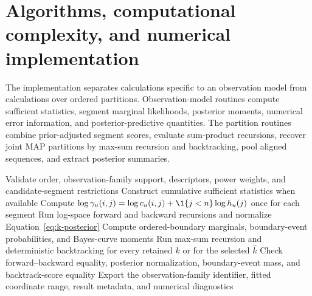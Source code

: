 \section{Algorithms, computational complexity, and numerical implementation}
\label{sec:algorithms}

The implementation separates calculations specific to an observation model from calculations over ordered partitions. Observation-model routines compute sufficient statistics, segment marginal likelihoods, posterior moments, numerical error information, and posterior-predictive quantities. The partition routines combine prior-adjusted segment scores, evaluate sum-product recursions, recover joint MAP partitions by max-sum recursion and backtracking, pool aligned sequences, and extract posterior summaries.

\begin{algorithm}[!htbp]
\caption{\BayesBreak offline fit}
\label{alg:bayesbreak-fit-paper}
Validate order, observation-family support, descriptors, power weights, and candidate-segment restrictions\;
Construct cumulative sufficient statistics when available\;
\For{each admissible segment $(i,j]$}{
  compute $\log A^{(0)}_{ij}$ and the required moments or posterior state\;
  record validity, convergence, and approximation diagnostics\;
  assign score $-\infty$ to an inadmissible segment rather than substituting a finite value from another model\;
}
Compute $\log\gamma_u(i,j)=\log c_u(i,j)+\1\{j<n\}\log h_u(j)$ once for each segment\;
Run log-space forward and backward recursions and normalize Equation~\eqref{eq:k-posterior}\;
Compute ordered-boundary marginals, boundary-event probabilities, and Bayes-curve moments\;
Run max-sum recursion and deterministic backtracking for every retained $k$ or for the selected $\widehat k$\;
Check forward--backward equality, posterior normalization, boundary-event mass, and backtrack-score equality\;
Export the observation-family identifier, fitted coordinate range, result metadata, and numerical diagnostics\;
\end{algorithm}


